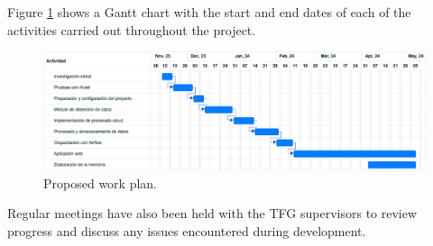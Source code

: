 Figure \ref{fig:gantt-diagram-en} shows a Gantt chart with the start and end dates of each of the activities carried out throughout the project.

\begin{figure}[h]
	\centering
	\includegraphics[width=1\textwidth]{Imagenes/Chapter_1/gant.png}
	\caption{Proposed work plan.}
	\label{fig:gantt-diagram-en}
\end{figure}

\noindent Regular meetings have also been held with the TFG supervisors to review progress and discuss any issues encountered during development.